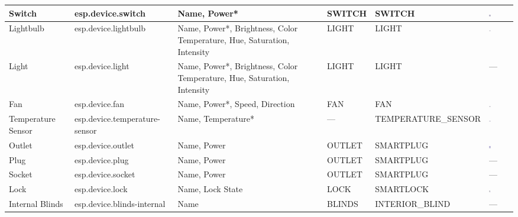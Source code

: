 \documentclass[a4paper,12pt,openany]{book}
\begin{document}
\begin{enumerate}[label=\textbf{(\arabic*)}]
{\begin{longtable}{|>{\RaggedRight}m{}|m{}|>{\RaggedRight}m{}|m{}|m{}|>{\Centering}m{}|}
        Switch&esp.device.switch&Name, Power*&SWITCH&SWITCH&\includegraphics[width=0.08\textwidth]{D9Z/switch}\\
        \hline
        Lightbulb&esp.device.lightbulb&Name, Power*, Brightness, Color Temperature, Hue, Saturation, Intensity&LIGHT&LIGHT&\includegraphics[width=0.08\textwidth]{D9Z/lightbulb}\\
        \hline
        Light&esp.device.light&Name, Power*, Brightness, Color Temperature, Hue, Saturation, Intensity&LIGHT&LIGHT&—\\
        \hline
        Fan&esp.device.fan&Name, Power*, Speed, Direction&FAN&FAN&\includegraphics[width=0.08\textwidth]{D9Z/fan}\\
        \hline
        Temperature Sensor&esp.device.temperature-sensor&Name, Temperature*&—&TEMPERATURE\_SENSOR&\includegraphics[width=0.08\textwidth]{D9Z/temp}\\
        \hline
        Outlet&esp.device.outlet&Name, Power&OUTLET&SMARTPLUG&\includegraphics[width=0.08\textwidth]{D9Z/outlet}\\
        \hline
        Plug&esp.device.plug&Name, Power&OUTLET&SMARTPLUG&—\\
        \hline
        Socket&esp.device.socket&Name, Power&OUTLET&SMARTPLUG&—\\
        \hline
        Lock&esp.device.lock&Name, Lock State&LOCK&SMARTLOCK&\includegraphics[width=0.08\textwidth]{D9Z/lock}\\
        \hline
        Internal Blinds&esp.device.blinds-internal&Name&BLINDS&INTERIOR\_BLIND&—\\

\end{longtable}}
\end{enumerate}
\end{document}
